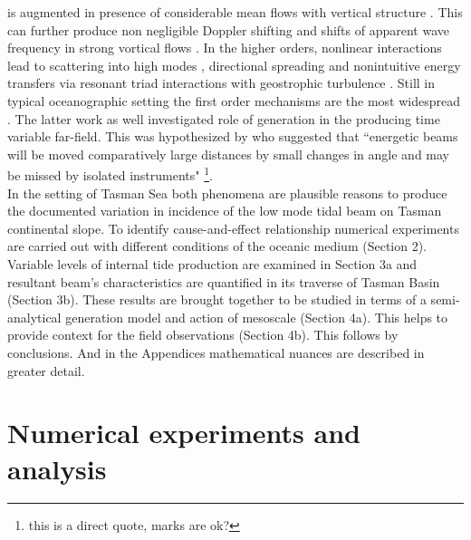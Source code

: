 \documentclass[12pt]{article}
\begin{document}
is augmented in presence of considerable mean flows with vertical structure 
\citep{park2006internal, buijsman2017eq}. This can further produce non negligible Doppler 
shifting 
\citep{chavanne2010surface} and shifts of apparent wave frequency in strong vortical flows 
\citep{kunze1985near}. In the higher orders, nonlinear interactions lead to scattering into 
high modes \citep{dunphy2014focusing}, directional spreading \citep{wagner2017asymptotic, 
dunphy2017low} and nonintuitive energy transfers via resonant triad interactions with geostrophic 
turbulence \citep{ward2010scattering}. Still in typical oceanographic setting the first order 
mechanisms are the most widespread \citep{kelly2016internal, zaron2014time}. The latter 
work as well investigated role of generation in the producing time variable far-field. This was  
 hypothesized by \citep{wunsch1975internal} who suggested that ``energetic beams will be moved 
comparatively large distances by small changes in angle and may be missed by isolated instruments" 
\footnote{this is a direct quote, marks are ok?}.\\
In the setting of Tasman Sea both phenomena are plausible reasons to produce the documented 
variation 
in incidence of the low mode tidal beam on Tasman continental slope. To identify cause-and-effect 
relationship numerical experiments are carried out with different conditions of the oceanic medium 
(Section 2). Variable levels of internal tide production are examined in Section 3a and 
resultant beam's characteristics are quantified in its traverse of Tasman Basin (Section 3b). 
These results are brought together to be studied in terms of a semi-analytical generation 
model and action of mesoscale (Section 4a). This helps to provide context for the field 
observations (Section 4b). This follows by conclusions. And in the Appendices mathematical nuances 
are described in greater detail.

\newpage

\section{Numerical experiments and analysis}
\end{document}
